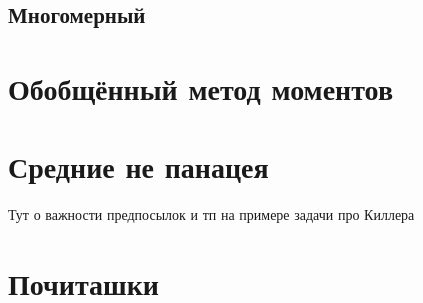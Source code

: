 \documentclass[12pt, a4paper, oneside]{article}
\begin{document}
\subsection{Многомерный} 

\section{Обобщённый метод моментов} 

\section{Средние не панацея}

Тут о важности предпосылок и тп на примере задачи про Киллера


\section*{Почиташки} 

\end{document}
